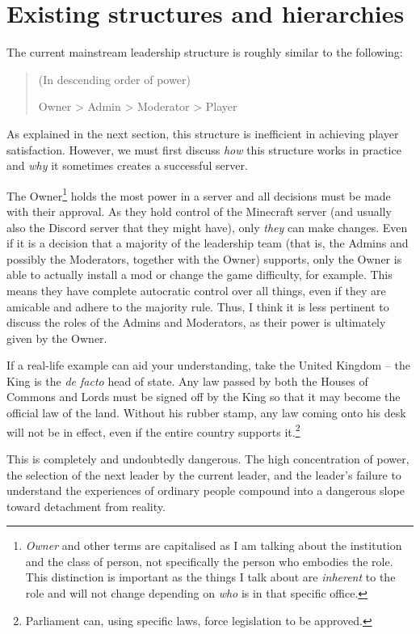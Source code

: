 \section{Existing structures and hierarchies}
The current mainstream leadership structure is roughly similar to the following:
\begin{quote}
    (In descending order of power)

    Owner > Admin > Moderator > Player
\end{quote}
As explained in the next section, this structure is inefficient in achieving player satisfaction. However, we must first discuss \emph{how} this structure works in practice and \emph{why} it sometimes creates a successful server.

The Owner\footnote{\emph{Owner} and other terms are capitalised as I am talking about the institution and the class of person, not specifically the person who embodies the role. This distinction is important as the things I talk about are \emph{inherent} to the role and will not change depending on \emph{who} is in that specific office.} holds the most power in a server and all decisions must be made with their approval. As they hold control of the Minecraft server (and usually also the Discord server that they might have), only \emph{they} can make changes. Even if it is a decision that a majority of the leadership team (that is, the Admins and possibly the Moderators, together with the Owner) supports, only the Owner is able to actually install a mod or change the game difficulty, for example. This means they have complete autocratic control over all things, even if they are amicable and adhere to the majority rule. Thus, I think it is less pertinent to discuss the roles of the Admins and Moderators, as their power is ultimately given by the Owner.

If a real-life example can aid your understanding, take the United Kingdom – the King is the \emph{de facto} head of state. Any law passed by both the Houses of Commons and Lords must be signed off by the King so that it may become the official law of the land. Without his rubber stamp, any law coming onto his desk will not be in effect, even if the entire country supports it.\footnote{Parliament can, using specific laws, force legislation to be approved.}

This is completely and undoubtedly dangerous. The high concentration of power, the selection of the next leader by the current leader, and the leader's failure to understand the experiences of ordinary people compound into a dangerous slope toward detachment from reality.

